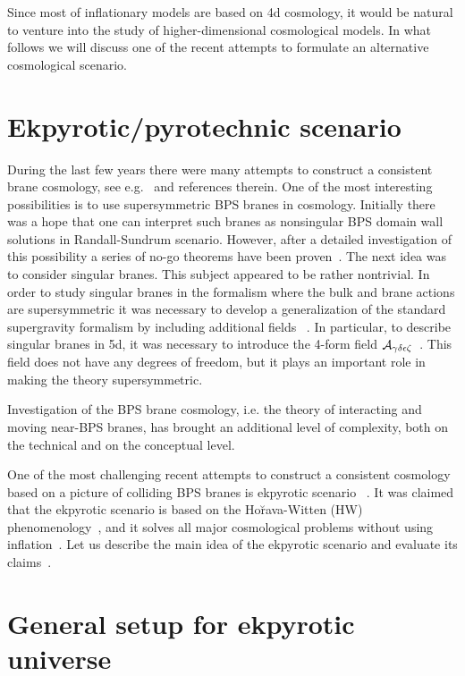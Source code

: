 \documentclass[a4paper,12pt]{article}
\begin{document}
Since most of inflationary models are based on 4d cosmology, it would be natural to venture into the study of higher-dimensional cosmological models. In what follows we will discuss one of the recent attempts to formulate an alternative cosmological scenario. 


 
\section{Ekpyrotic/pyrotechnic scenario}   
 


During the last few years there were many  attempts to construct a   
consistent   brane cosmology, see e.g.~\cite{brane,Binetruy:2000ut,DvaliTye} and references therein. One of the   
most interesting  possibilities is to use supersymmetric BPS branes in   
cosmology. Initially there was a hope that one can interpret such branes as nonsingular BPS domain wall solutions in Randall-Sundrum scenario. However, after a detailed investigation of this possibility a series of no-go theorems have been proven~\cite{KL}. The next idea was to consider singular branes. This subject appeared to be rather nontrivial. In order to study singular branes in the formalism where the bulk and brane  actions are supersymmetric it was necessary to develop a generalization of the standard supergravity formalism by including additional fields ~\cite{BKV}. In particular, to describe singular branes in 5d, it was necessary to introduce the 4-form field ${\cal A}_{\gamma\delta\epsilon\zeta}$~\cite{BKV}. This field does not have any degrees of freedom, but it plays an important role in making the theory supersymmetric.

Investigation of the BPS brane cosmology, i.e.   
the theory of interacting and moving near-BPS branes, has brought an   
additional level of complexity, both on the technical and on the   
conceptual level. 

One of the most challenging  recent  attempts  to construct 
a consistent  cosmology  based on  a picture of colliding BPS branes 
is  ekpyrotic scenario ~\cite{KOST}.
It was claimed   that the ekpyrotic scenario is based on the   
Ho\u{r}ava-Witten (HW) phenomenology~\cite{HoravaWitten},  and it solves all major   
cosmological problems without using inflation~\cite{KOST}. 
Let us describe the main idea of the ekpyrotic scenario and evaluate its claims~\cite{KKL,KKLT}.

\section{General setup for ekpyrotic universe}\label{setup}
\end{document}
